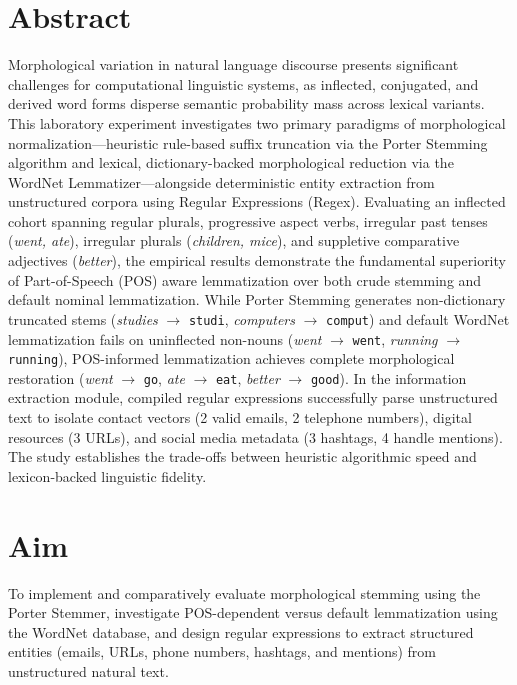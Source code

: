 \documentclass[12pt,a4paper]{report}
\begin{document}
\section{Abstract}
Morphological variation in natural language discourse presents significant challenges for computational linguistic systems, as inflected, conjugated, and derived word forms disperse semantic probability mass across lexical variants. This laboratory experiment investigates two primary paradigms of morphological normalization---heuristic rule-based suffix truncation via the Porter Stemming algorithm and lexical, dictionary-backed morphological reduction via the WordNet Lemmatizer---alongside deterministic entity extraction from unstructured corpora using Regular Expressions (Regex). Evaluating an inflected cohort spanning regular plurals, progressive aspect verbs, irregular past tenses (\textit{went, ate}), irregular plurals (\textit{children, mice}), and suppletive comparative adjectives (\textit{better}), the empirical results demonstrate the fundamental superiority of Part-of-Speech (POS) aware lemmatization over both crude stemming and default nominal lemmatization. While Porter Stemming generates non-dictionary truncated stems (\textit{studies} $\to$ \texttt{studi}, \textit{computers} $\to$ \texttt{comput}) and default WordNet lemmatization fails on uninflected non-nouns (\textit{went} $\to$ \texttt{went}, \textit{running} $\to$ \texttt{running}), POS-informed lemmatization achieves complete morphological restoration (\textit{went} $\to$ \texttt{go}, \textit{ate} $\to$ \texttt{eat}, \textit{better} $\to$ \texttt{good}). In the information extraction module, compiled regular expressions successfully parse unstructured text to isolate contact vectors (2 valid emails, 2 telephone numbers), digital resources (3 URLs), and social media metadata (3 hashtags, 4 handle mentions). The study establishes the trade-offs between heuristic algorithmic speed and lexicon-backed linguistic fidelity.

\section{Aim}
To implement and comparatively evaluate morphological stemming using the Porter Stemmer, investigate POS-dependent versus default lemmatization using the WordNet database, and design regular expressions to extract structured entities (emails, URLs, phone numbers, hashtags, and mentions) from unstructured natural text.
\end{document}
